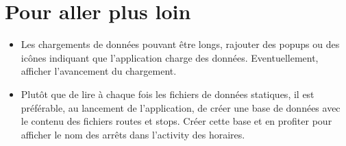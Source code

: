 \documentclass{article}
\begin{document}
\section{Pour aller plus loin}
\begin{itemize}
  \item Les chargements de données pouvant être longs, rajouter des popups ou
  des icônes indiquant que l'application charge des données. Eventuellement,
  afficher l'avancement du chargement.
  \item Plutôt que de lire à chaque fois les fichiers de données statiques, il
  est préférable, au lancement de l'application, de créer une base de données
  avec le contenu des fichiers routes et stops. Créer cette base et en profiter
  pour afficher le nom des arrêts dans l'activity des horaires.
\end{itemize}
\end{document}
